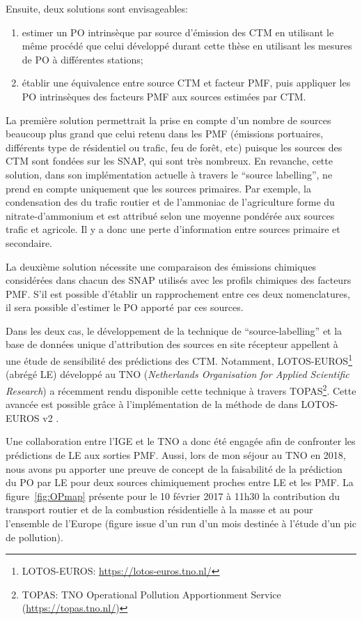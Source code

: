 Ensuite, deux solutions sont envisageables:
\begin{enumerate}
    \item estimer un PO intrinsèque par source d'émission des CTM en utilisant le même
        procédé que celui développé durant cette thèse en utilisant les mesures de PO à
        différentes stations;
    \item établir une équivalence entre source CTM et facteur PMF, puis appliquer les
        PO intrinsèques des facteurs PMF aux sources estimées par CTM.
\end{enumerate}

La première solution permettrait la prise en compte d'un nombre de sources beaucoup plus
grand que celui retenu dans les PMF (émissions portuaires, différents type de résidentiel
ou trafic, feu de forêt, etc) puisque les sources des CTM sont fondées sur les SNAP, qui
sont très nombreux.
En revanche, cette solution, dans son implémentation actuelle à travers le ``source
labelling'', ne prend en compte uniquement que les sources primaires. Par exemple, la
condensation des  du trafic routier et de l'ammoniac de l'agriculture forme du
nitrate-d'ammonium et est attribué selon une moyenne pondérée aux sources trafic et
agricole. Il y a donc une perte d'information entre sources primaire et secondaire.

La deuxième solution nécessite une comparaison des émissions chimiques considérées dans
chacun des SNAP utilisés avec les profils chimiques des facteurs PMF. S'il est possible
d'établir un rapprochement entre ces deux nomenclatures, il sera possible d'estimer le PO
apporté par ces sources.

Dans les deux cas, le développement de la technique de ``source-labelling'' et la base de
données unique d'attribution des sources en site récepteur appellent à une étude de
sensibilité des prédictions des CTM. Notamment, LOTOS-EUROS\footnote{LOTOS-EUROS:
    \url{https://lotos-euros.tno.nl/}} (abrégé LE) développé au TNO (\textit{Netherlands Organisation for
Applied Scientific Research}) a récemment rendu disponible cette technique à travers TOPAS\footnote{TOPAS:
TNO Operational Pollution Apportionment Service (\url{https://topas.tno.nl/})}. Cette
avancée est possible grâce à l'implémentation de la méthode de \cite{kranenburgSource2013} dans
LOTOS-EUROS v2 \autocite{mandersCurriculum2017}.

Une collaboration entre l'IGE et le TNO a donc été engagée afin de confronter les
prédictions de LE aux sorties PMF. Aussi, lors de mon séjour au TNO en 2018, nous
avons pu apporter une preuve de concept de la faisabilité de la prédiction du PO par
LE pour deux sources chimiquement proches entre LE et les PMF.
La figure~\ref{fig:OPmap} présente pour le 10 février 2017 à 11h30 la contribution du
transport routier et de la combustion résidentielle à la masse et au \PODTTv{} pour
l'ensemble de l'Europe (figure issue d'un run d'un mois destinée à l'étude d'un pic de
pollution).

